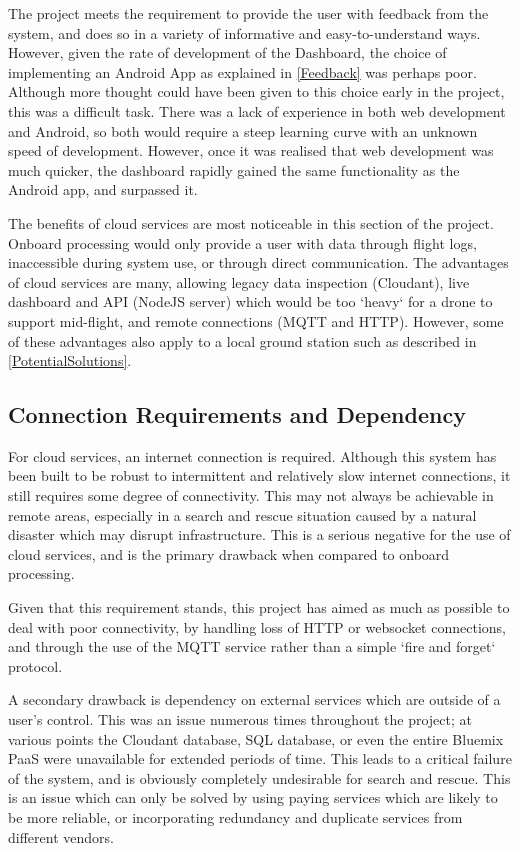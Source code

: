 \documentclass{article}
\begin{document}
The project meets the requirement to provide the user with feedback from the system, and does so in a variety of informative and easy-to-understand ways. However, given the rate of development of the Dashboard, the choice of implementing an Android App as explained in \ref{Feedback} was perhaps poor. Although more thought could have been given to this choice early in the project, this was a difficult task. There was a lack of experience in both web development and Android, so both would require a steep learning curve with an unknown speed of development. However, once it was realised that web development was much quicker, the dashboard rapidly gained the same functionality as the Android app, and surpassed it. 

The benefits of cloud services are most noticeable in this section of the project. Onboard processing would only provide a user with data through flight logs, inaccessible during system use, or through direct communication. The advantages of cloud services are many, allowing legacy data inspection (Cloudant), live dashboard and API (NodeJS server) which would be too `heavy` for a drone to support mid-flight, and remote connections (MQTT and HTTP). However, some of these advantages also apply to a local ground station such as described in \ref{PotentialSolutions}.


\subsection{Connection Requirements and Dependency}
For cloud services, an internet connection is required. Although this system has been built to be robust to intermittent and relatively slow internet connections, it still requires some degree of connectivity. This may not always be achievable in remote areas, especially in a search and rescue situation caused by a natural disaster which may disrupt infrastructure. This is a serious negative for the use of cloud services, and is the primary drawback when compared to onboard processing. 

Given that this requirement stands, this project has aimed as much as possible to deal with poor connectivity, by handling loss of HTTP or websocket connections, and through the use of the MQTT service rather than a simple `fire and forget` protocol. 

A secondary drawback is dependency on external services which are outside of a user's control. This was an issue numerous times throughout the project; at various points the Cloudant database, SQL database, or even the entire Bluemix PaaS were unavailable for extended periods of time. This leads to a critical failure of the system, and is obviously completely undesirable for search and rescue. This is an issue which can only be solved by using paying services which are likely to be more reliable, or incorporating redundancy and duplicate services from different vendors.  
\end{document}
